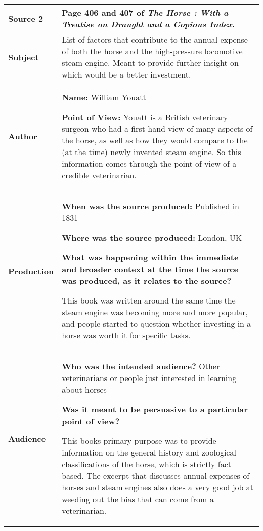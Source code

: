 {\renewcommand{\arraystretch}{2}
\begin{longtable}{ | p{3cm} | p{13cm} | }
\hline

\textbf{Source 2} &
Page 406 and 407 of \emph{The Horse : With a Treatise on Draught and a Copious Index}.
\\\hline

\textbf{Subject} &
List of factors that contribute to the annual expense of both the horse and the high-pressure locomotive steam engine.  Meant to provide further insight on which would be a better investment.
\\\hline

\textbf{Author} &
\textbf{Name:} William Youatt \n

\textbf{Point of View:} Youatt is a British veterinary surgeon who had a first hand view of many aspects of the horse, as well as how they would compare to the (at the time) newly invented steam engine.  So this information comes through the point of view of a credible veterinarian.
\\\hline

\textbf{Production} &
\textbf{When was the source produced:} Published in 1831

\textbf{Where was the source produced:} London, UK \n

\textbf{What was happening within the immediate and broader context at the time the source was produced, as it relates to the source? } \n

This book was written around the same time the steam engine was becoming more and more popular, and people started to question whether investing in a horse was worth it for specific tasks.
\\\hline

\textbf{Audience} &
\textbf{Who was the intended audience?} Other veterinarians or people just interested in learning about horses \n 

\textbf{Was it meant to be persuasive to a particular point of view? } \n

This books primary purpose was to provide information on the general history and zoological classifications of the horse, which is strictly fact based.  The excerpt that discusses annual expenses of horses and steam engines also does a very good job at weeding out the bias that can come from a veterinarian.
\\\hline
\end{longtable}}